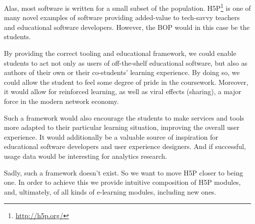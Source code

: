 Alas, most software is written for a small subset of the population. 
H5P\footnote{\url{http://h5p.org/}} is one of many novel examples of software 
providing added-value to tech-savvy teachers and educational software 
developers. However, the BOP would in this case be the students.

By providing the correct tooling and educational framework, we could enable 
students to act not only as users of off-the-shelf educational software, but 
also as authors of their own or their co-students' learning experience. By
doing so, we could allow the student to feel some degree of pride in the
coursework. Moreover, it would allow for reinforced learning, as well as viral 
effects (sharing), a major force in the modern network economy.

Such a framework would also encourage the students to make services and tools
more adapted to their particular learning situation, improving the overall
user experience. It would additionally be a valuable source of inspiration for 
educational software developers and user experience designers. And if 
successful, usage data would be interesting for analytics research.

Sadly, such a framework doesn't exist. So we want to move H5P closer to being 
one. In order to achieve this we provide intuitive composition of H5P modules, 
and, ultimately, of all kinds of e-learning modules, including new ones.
